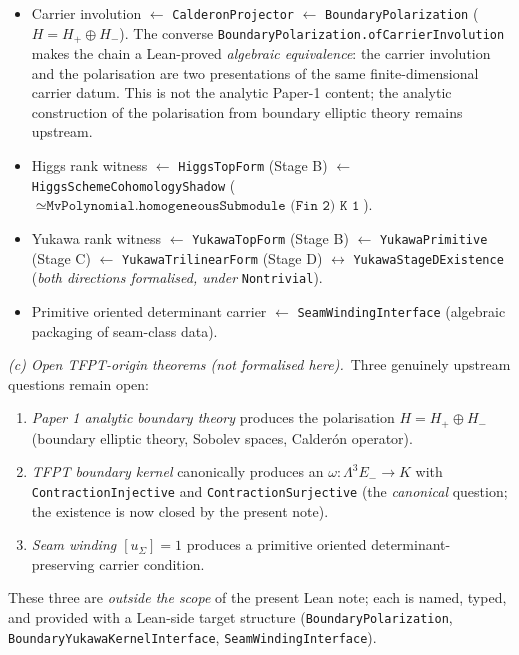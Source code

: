 \begin{tfptclaimcontract}
\begin{itemize}[leftmargin=1.6em, itemsep=0pt]
  \item Carrier involution $\leftarrow$
    \texttt{CalderonProjector} $\leftarrow$
    \texttt{BoundaryPolarization} ($H = H_+ \oplus H_-$).
    The converse \texttt{BoundaryPolarization.ofCarrierInvolution}
    makes the chain a Lean-proved \emph{algebraic
    equivalence}: the carrier involution and the polarisation
    are two presentations of the same finite-dimensional
    carrier datum. This is not the analytic Paper-1 content;
    the analytic construction of the polarisation from
    boundary elliptic theory remains upstream.
  \item Higgs rank witness $\leftarrow$
    \texttt{HiggsTopForm} (Stage B) $\leftarrow$
    \texttt{HiggsSchemeCohomologyShadow}
    ($\simeq \texttt{MvPolynomial.homogeneousSubmodule (Fin 2) K 1}$).
  \item Yukawa rank witness $\leftarrow$
    \texttt{YukawaTopForm} (Stage B) $\leftarrow$
    \texttt{YukawaPrimitive} (Stage C) $\leftarrow$
    \texttt{YukawaTrilinearForm} (Stage D) $\leftrightarrow$
    \texttt{YukawaStageDExistence} (\emph{both directions
    formalised, under} \texttt{Nontrivial}).
  \item Primitive oriented determinant carrier $\leftarrow$
    \texttt{SeamWindingInterface} (algebraic packaging of
    seam-class data).
\end{itemize}

\smallskip
\noindent
\emph{(c) Open TFPT-origin theorems (not formalised here).}\ Three
genuinely upstream questions remain open:

\begin{enumerate}[leftmargin=1.6em, itemsep=0pt, label=(\arabic*)]
  \item \emph{Paper 1 analytic boundary theory} produces the
    polarisation $H = H_+ \oplus H_-$ (boundary elliptic
    theory, Sobolev spaces, Calder\'on operator).
  \item \emph{TFPT boundary kernel} canonically produces an
    $\omega : \Lambda^3 E_- \to K$ with
    \texttt{ContractionInjective} and
    \texttt{ContractionSurjective} (the \emph{canonical}
    question; the existence is now closed by the present
    note).
  \item \emph{Seam winding $[u_\Sigma] = 1$} produces a
    primitive oriented determinant-preserving carrier
    condition.
\end{enumerate}

These three are \emph{outside the scope} of the present Lean
note; each is named, typed, and provided with a Lean-side
target structure
(\texttt{BoundaryPolarization},
\texttt{BoundaryYukawaKernelInterface},
\texttt{SeamWindingInterface}).


\end{tfptclaimcontract}
